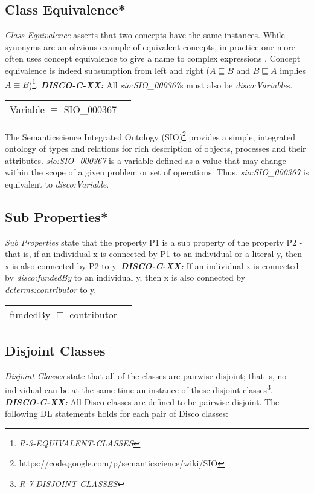 \documentclass{elsart3p}    %
\newenvironment{DL}{
  \vspace{0cm}
  \begin{tabular}{l l}

}{
  \end{tabular}
}
\begin{document}
\subsection{Class Equivalence*}

{\em Class Equivalence} asserts that two concepts have the same instances.
While synonyms are an obvious example of equivalent concepts, in practice one more
often uses concept equivalence to give a name to complex expressions \cite{Kroetzsch2012}.
Concept equivalence is indeed subsumption from left and right ($A \sqsubseteq B$ and $B \sqsubseteq A$ implies $A \equiv B$)\footnote{{\em R-3-EQUIVALENT-CLASSES}}.
\textbf{{\em DISCO-C-XX:}}
All {\em sio:SIO\_000367}s must also be {\em disco:Variable}s.

\begin{DL}
Variable $\equiv$ SIO\_000367
\end{DL}

The Semanticscience Integrated Ontology (SIO)\footnote{https://code.google.com/p/semanticscience/wiki/SIO} provides a simple, integrated ontology of types and relations for rich description of objects, processes and their attributes.
{\em sio:SIO\_000367} is a variable defined as a value that may change within the scope of a given problem or set of operations.
Thus, {\em sio:SIO\_000367} is equivalent to {\em disco:Variable}.

\subsection{Sub Properties*}

{\em Sub Properties} state that the property P1 is a sub property of the property P2 - that is, if an individual x is connected by P1 to an individual or a literal y, then x is also connected by P2 to y. 
\textbf{{\em DISCO-C-XX:}}
If an individual x is connected by {\em disco:fundedBy} to an individual y, then x is also connected by {\em dcterms:contributor} to y. 

\begin{DL}
fundedBy $\sqsubseteq$ contributor 
\end{DL}

\subsection{Disjoint Classes}

{\em Disjoint Classes} state that all of the classes are pairwise disjoint; 
that is, no individual can be at the same time an instance of these disjoint classes\footnote{{\em R-7-DISJOINT-CLASSES}}.
\textbf{{\em DISCO-C-XX:}} 
All Disco classes are defined to be pairwise disjoint.
The following DL statements holds for each pair of Disco classes:
\end{document}
